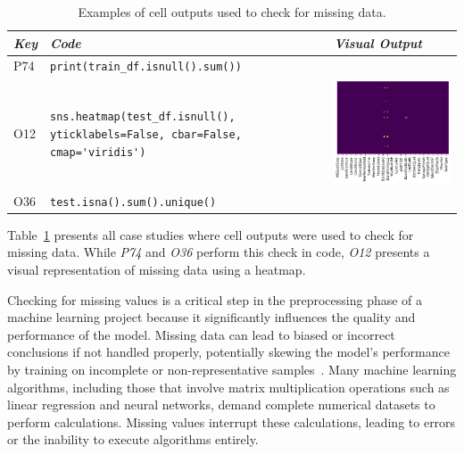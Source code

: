 \begin{table}
  \centering
  \caption{Examples of cell outputs used to check for missing data.}
  \begin{tabular}{@{}m{} m{} m{}@{}}
    \toprule
    \emph{\textbf{Key}}&
    \emph{\textbf{Code}}&
    \emph{\textbf{Visual Output}}\\
    \midrule

    P74&
    \lstinline[]$print(train_df.isnull().sum())$\\

    O12&
    \lstinline[]$sns.heatmap(test_df.isnull(), yticklabels=False, cbar=False, cmap='viridis')$&
    \includegraphics[width=\linewidth]{missing-value-check.png}\\

    O36&
    \lstinline[]$test.isna().sum().unique()$\\
    \bottomrule
  \end{tabular}
  \label{tab:missing-value}
\end{table}

Table~\ref{tab:missing-value} presents all case studies where cell outputs were used to check for missing data. While \emph{P74} and \emph{O36} perform this check in code, \emph{O12} presents a visual representation of missing data using a heatmap.

Checking for missing values is a critical step in the preprocessing phase of a machine learning project because it significantly influences the quality and performance of the model. Missing data can lead to biased or incorrect conclusions if not handled properly, potentially skewing the model's performance by training on incomplete or non-representative samples~\cite{shome2022data}. Many machine learning algorithms, including those that involve matrix multiplication operations such as linear regression and neural networks, demand complete numerical datasets to perform calculations. Missing values interrupt these calculations, leading to errors or the inability to execute algorithms entirely.

